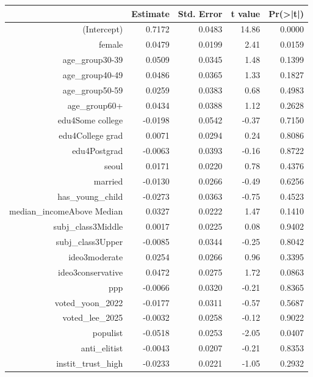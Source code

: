 \begin{tabular}{rrrrr}
  \toprule
 & Estimate & Std. Error & t value & Pr(>|t|) \\ 
  \midrule
(Intercept) & 0.7172 & 0.0483 & 14.86 & 0.0000 \\ 
  female & 0.0479 & 0.0199 & 2.41 & 0.0159 \\ 
  age_group30-39 & 0.0509 & 0.0345 & 1.48 & 0.1399 \\ 
  age_group40-49 & 0.0486 & 0.0365 & 1.33 & 0.1827 \\ 
  age_group50-59 & 0.0259 & 0.0383 & 0.68 & 0.4983 \\ 
  age_group60+ & 0.0434 & 0.0388 & 1.12 & 0.2628 \\ 
  edu4Some college & -0.0198 & 0.0542 & -0.37 & 0.7150 \\ 
  edu4College grad & 0.0071 & 0.0294 & 0.24 & 0.8086 \\ 
  edu4Postgrad & -0.0063 & 0.0393 & -0.16 & 0.8722 \\ 
  seoul & 0.0171 & 0.0220 & 0.78 & 0.4376 \\ 
  married & -0.0130 & 0.0266 & -0.49 & 0.6256 \\ 
  has_young_child & -0.0273 & 0.0363 & -0.75 & 0.4523 \\ 
  median_incomeAbove Median & 0.0327 & 0.0222 & 1.47 & 0.1410 \\ 
  subj_class3Middle & 0.0017 & 0.0225 & 0.08 & 0.9402 \\ 
  subj_class3Upper & -0.0085 & 0.0344 & -0.25 & 0.8042 \\ 
  ideo3moderate & 0.0254 & 0.0266 & 0.96 & 0.3395 \\ 
  ideo3conservative & 0.0472 & 0.0275 & 1.72 & 0.0863 \\ 
  ppp & -0.0066 & 0.0320 & -0.21 & 0.8365 \\ 
  voted_yoon_2022 & -0.0177 & 0.0311 & -0.57 & 0.5687 \\ 
  voted_lee_2025 & -0.0032 & 0.0258 & -0.12 & 0.9022 \\ 
  populist & -0.0518 & 0.0253 & -2.05 & 0.0407 \\ 
  anti_elitist & -0.0043 & 0.0207 & -0.21 & 0.8353 \\ 
  instit_trust_high & -0.0233 & 0.0221 & -1.05 & 0.2932 \\ 
   \bottomrule
\end{tabular}
